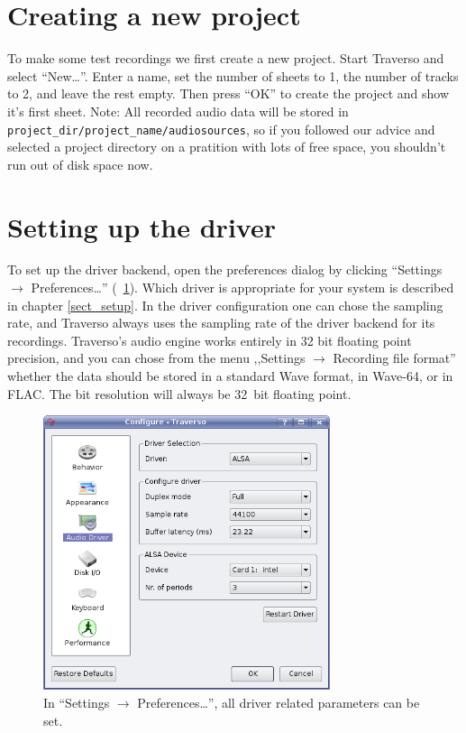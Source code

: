 \section{Creating a new project}
To make some test recordings we first create a new project. Start Traverso and select ``New\dots''. Enter a name, set the number of sheets to 1, the number of tracks to 2, and leave the rest empty. Then press ``OK'' to create the project and show it's first sheet. Note: All recorded audio data will be stored in \texttt{project\_dir/project\_name/audiosources}, so if you followed our advice and selected a project directory on a pratition with lots of free space, you shouldn't run out of disk space now.

\section{Setting up the driver}
To set up the driver backend, open the preferences dialog by clicking ``Settings $\rightarrow$ Preferences\dots'' (\FigB\ \ref{fig_driversettings}). Which driver is appropriate for your system is described in chapter \ref{sect_setup}. In the driver configuration one can chose the sampling rate, and Traverso always uses the sampling rate of the driver backend for its recordings. Traverso's audio engine works entirely in 32 bit floating point precision, and you can chose from the menu ,,Settings $\rightarrow$ Recording file format'' whether the data should be stored in a standard Wave format, in Wave-64, or in FLAC. The bit resolution will always be 32~bit floating point.

\begin{figure}
 \centering\includegraphics[width=0.75\textwidth]{images/driversettings.png}
 \caption{In ``Settings $\rightarrow$ Preferences\dots'', all driver related parameters can be set.}
 \label{fig_driversettings}
\end{figure}

